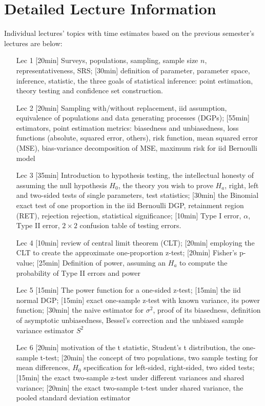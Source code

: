 \section*{Detailed Lecture Information}

Individual lectures' topics with time estimates based on the previous semester's lectures are below:

\begin{enumerate}
\item[Lec 1] [20min] Surveys, populations, sampling, sample size $n$, representativeness, SRS; [30min] definition of parameter, parameter space, inference, statistic, the three goals of statistical inference: point estimation, theory testing and confidence set construction. 

\item[Lec 2] [20min] Sampling with/without replacement, iid assumption, equivalence of populations and data generating processes (DGPs); [55min] estimators, point estimation metrics: biasedness and unbiasedness, loss functions (absolute, squared error, others), risk function, mean squared error (MSE), bias-variance decomposition of MSE, maximum risk for iid Bernoulli model

\item[Lec 3] [35min] Introduction to hypothesis testing, the intellectual honesty of assuming the null hypothesis $H_0$, the theory you wish to prove $H_a$, right, left and two-sided tests of single parameters, test statistics; [30min] the Binomial exact test of one proportion in the iid Bernoulli DGP, retainment region (RET), rejection rejection, statistical significance; [10min] Type I error, $\alpha$, Type II error, $2 \times 2$ confusion table of testing errors.

\item[Lec 4] [10min] review of central limit theorem (CLT); [20min] employing the CLT to create the approximate one-proportion z-test; [20min] Fisher's p-value; [25min] Definition of power, assuming an $H_a$ to compute the probability of Type II errors and power

\item[Lec 5] [15min] The power function for a one-sided z-test; [15min] the iid normal DGP; [15min] exact one-sample z-test with known variance, its power function; [30min] the naive estimator for $\sigma^2$, proof of its biasedness, definition of asymptotic unbiasedness, Bessel's correction and the unbiased sample variance estimator $S^2$

\item[Lec 6] [20min] motivation of the t statistic, Student's t distribution, the one-sample t-test; [20min] the concept of two populations, two sample testing for mean differences, $H_0$ specification for left-sided, right-sided, two sided tests; [15min] the exact two-sample z-test under different variances and shared variance; [20min] the exact two-sample t-test under shared variance, the pooled standard deviation estimator


\end{enumerate}
